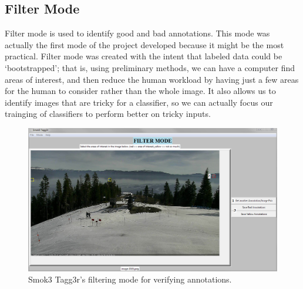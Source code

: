 \documentclass{article}
\begin{document}
\subsection{Filter Mode}
Filter mode is used to identify good and bad annotations. This mode was actually the first mode of the project developed because it might be the most practical. Filter mode was created with the intent that labeled data could be `bootstrapped'; that is, using preliminary methods, we can have a computer find areas of interest, and then reduce the human workload by having just a few areas for the human to consider rather than the whole image. It also allows us to identify images that are tricky for a classifier, so we can actually focus our trainging of classifiers to perform better on tricky inputs.

  \begin{figure}[h!]
    \centering
    \includegraphics[width=.9\linewidth]{filter_mode}
    \caption{Smok3 Tagg3r's filtering mode for verifying annotations.}
    \label{fig:filter_mode}
  \end{figure}
\end{document}
